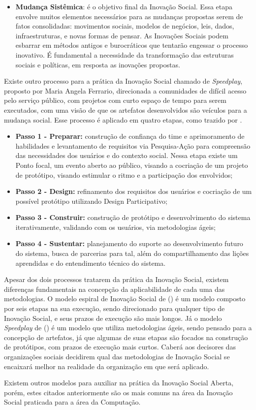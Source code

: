 \begin{itemize}
    \item \textbf{Mudança Sistêmica}: é o objetivo final da Inovação Social. Essa etapa envolve muitos elementos necessários para as mudanças propostas serem de fatos consolidadas: movimentos sociais, modelos de negócios, leis, dados, infraestruturas, e novas formas de pensar. As Inovações Sociais podem esbarrar em métodos antigos e burocráticos que tentarão engessar o processo inovativo. É fundamental a necessidade da transformação das estruturas sociais e políticas, em resposta as inovações propostas.
\end{itemize}

Existe outro processo para a prática da Inovação Social chamado de \textit{Speedplay}, proposto por Maria Angela Ferrario, direcionada a comunidades de difícil acesso pelo serviço público, com projetos com curto espaço de tempo para serem executados, com uma visão de que os artefatos desenvolvidos são veículos para a mudança social. Esse processo é aplicado em quatro etapas, como trazido por \citeauthor{ferrario2014}. 



\begin{itemize}
    \item \textbf{Passo 1 - Preparar:} construção de confiança do time e aprimoramento de habilidades e levantamento de requisitos via Pesquisa-Ação para compreensão das necessidades dos usuários e do contexto social. Nessa etapa existe um Ponto focal, um evento aberto ao público, visando a cocriação de um projeto de protótipo, visando estimular o ritmo e a participação dos envolvidos;
    \item \textbf{Passo 2 - Design:} refinamento dos requisitos dos usuários e cocriação de um possível protótipo utilizando Design Participativo;
    \item \textbf{Passo 3 - Construir:} construção de protótipo e desenvolvimento do sistema iterativamente, validando com os usuários, via metodologias ágeis;
    \item \textbf{Passo 4 - Sustentar:} planejamento do suporte ao desenvolvimento futuro do sistema, busca de parcerias para tal, além do compartilhamento das lições aprendidas e do entendimento técnico do sistema.
\end{itemize}

Apesar dos dois processos tratarem da prática da Inovação Social, existem diferenças fundamentais na concepção da aplicabilidade de cada uma das metodologias. O modelo espiral de Inovação Social de \citeauthor{murray2010} (\citeyear{murray2010}) é um modelo composto por seis etapas na sua execução, sendo direcionado para qualquer tipo de Inovação Social, e seus prazos de execução são mais longos. Já o modelo \textit{Speedplay} de \citeauthor{ferrario2014} (\citeyear{ferrario2014}) é um modelo que utiliza metodologias ágeis, sendo pensado para a concepção de artefatos, já que algumas de suas etapas são focados na construção de protótipos, com prazos de execução mais curtos. Caberá aos decisores das organizações sociais decidirem qual das metodologias de Inovação Social se encaixará melhor na realidade da organização em que será aplicado.

Existem outros modelos para auxiliar na prática da Inovação Social Aberta, porém, estes citados anteriormente são os mais comuns na área da Inovação Social praticada para a área da Computação.

